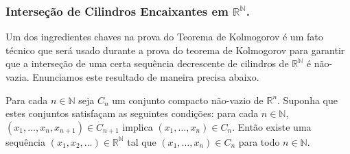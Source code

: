 \subsubsection{Interseção de Cilindros Encaixantes 
em $\mathbb{R}^{\mathbb{N}}$.}

Um dos ingredientes chaves na prova do Teorema 
de Kolmogorov é um fato técnico que será usado
durante a prova do teorema de Kolmogorov 
para garantir que a interseção de uma certa sequência 
decrescente de cilindros de $\mathbb{R}^{\mathbb{N}}$
é não-vazia. 
Enunciamos este resultado de maneira precisa abaixo.

\begin{teorema}\label{teo-intersecao-cilindros-teo-kolmogorov}
Para cada $n\in\mathbb{N}$ seja $C_n$ um conjunto 
compacto não-vazio de $\mathbb{R}^n$.
Suponha que estes conjuntos satisfaçam as seguintes
condições: para cada $n\in\mathbb{N}$, 
$(x_1,\ldots,x_n,x_{n+1})\in C_{n+1}$
implica $(x_1,\ldots,x_n)\in C_{n}$.
Então existe uma sequência 
$(x_1,x_2,\ldots)\in\mathbb{R}^{\mathbb{N}}$ tal 
que $(x_1,\ldots,x_n)\in C_n$ para todo $n\in\mathbb{N}$.
\end{teorema}

